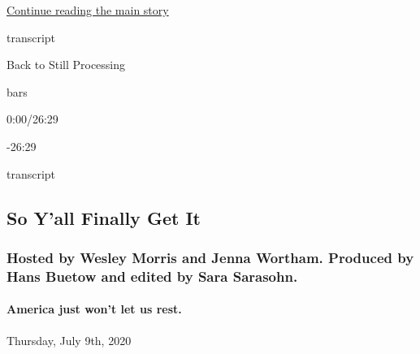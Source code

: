 \protect\hyperlink{after-top}{Continue reading the main story}

transcript

Back to Still Processing

bars

0:00/26:29

-26:29

transcript

\hypertarget{so-yall-finally-get-it}{%
\subsection{So Y'all Finally Get It}\label{so-yall-finally-get-it}}

\hypertarget{hosted-by-wesley-morris-and-jenna-wortham-produced-by-hans-buetow-and-edited-by-sara-sarasohn}{%
\subsubsection{Hosted by Wesley Morris and Jenna Wortham. Produced by
Hans Buetow and edited by Sara
Sarasohn.}\label{hosted-by-wesley-morris-and-jenna-wortham-produced-by-hans-buetow-and-edited-by-sara-sarasohn}}

\hypertarget{america-just-wont-let-us-rest}{%
\paragraph{America just won't let us
rest.}\label{america-just-wont-let-us-rest}}

Thursday, July 9th, 2020

